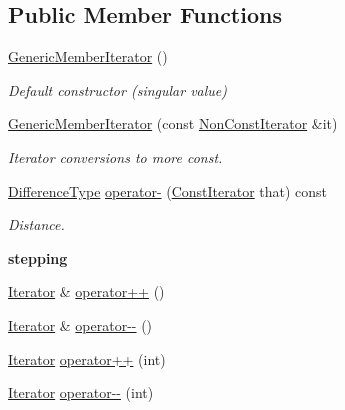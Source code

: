 \subsection*{Public Member Functions}
\begin{DoxyCompactItemize}
\item 
\hyperlink{classGenericMemberIterator_a2708717d497a0aadacdf75900de4c5b4}{Generic\+Member\+Iterator} ()
\begin{DoxyCompactList}\small\item\em Default constructor (singular value) \end{DoxyCompactList}\item 
\hyperlink{classGenericMemberIterator_a2697fd327a90654b0bf91c988e43f95e}{Generic\+Member\+Iterator} (const \hyperlink{classGenericMemberIterator_abc26eb06f2962765b11dcd06ce84ac02}{Non\+Const\+Iterator} \&it)
\begin{DoxyCompactList}\small\item\em Iterator conversions to more const. \end{DoxyCompactList}\item 
\hyperlink{classGenericMemberIterator_a902b99c8ae351cd7626514dc5f30740a}{Difference\+Type} \hyperlink{classGenericMemberIterator_a056851821e75c4be13b297604bc37c0b}{operator-\/} (\hyperlink{classGenericMemberIterator_ae5be27a73dce0be58ee2776db896d591}{Const\+Iterator} that) const 
\begin{DoxyCompactList}\small\item\em Distance. \end{DoxyCompactList}\end{DoxyCompactItemize}
\begin{Indent}{\bf stepping}\par
\begin{DoxyCompactItemize}
\item 
\hyperlink{classGenericMemberIterator_ad1cf1ecf6210b47906c9f179c893a8b8}{Iterator} \& \hyperlink{classGenericMemberIterator_afd6c9a104e2285d1d0b50bde53c9109e}{operator++} ()
\item 
\hyperlink{classGenericMemberIterator_ad1cf1ecf6210b47906c9f179c893a8b8}{Iterator} \& \hyperlink{classGenericMemberIterator_a6db8972f02d74b663b6ef90ee3ff34f6}{operator-\/-\/} ()
\item 
\hyperlink{classGenericMemberIterator_ad1cf1ecf6210b47906c9f179c893a8b8}{Iterator} \hyperlink{classGenericMemberIterator_a83c8be6d960213ce32d68a880a8d9089}{operator++} (int)
\item 
\hyperlink{classGenericMemberIterator_ad1cf1ecf6210b47906c9f179c893a8b8}{Iterator} \hyperlink{classGenericMemberIterator_a4606c8baec5ea2b5139a503f7caa5444}{operator-\/-\/} (int)
\end{DoxyCompactItemize}
\end{Indent}
